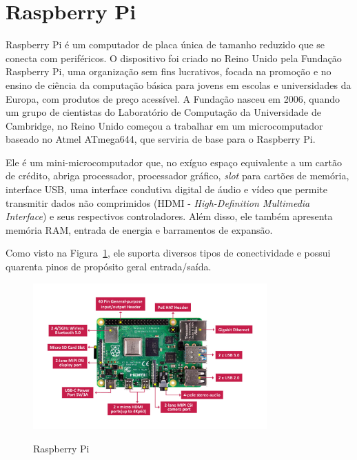 \section{Raspberry Pi}
\label{sec:raspberrypi}

Raspberry Pi é um computador de placa única de tamanho reduzido que se conecta com periféricos. O dispositivo foi criado no Reino Unido pela Fundação Raspberry Pi, uma organização sem fins lucrativos, focada na promoção e no ensino de ciência da computação básica para jovens em escolas e universidades da Europa, com produtos de preço acessível. A Fundação nasceu em 2006, quando um grupo de cientistas do Laboratório de Computação da Universidade de Cambridge, no Reino Unido começou a trabalhar em um microcomputador baseado no Atmel ATmega644, que serviria de base para o Raspberry Pi.

Ele é um mini-microcomputador que, no exíguo espaço equivalente a um cartão de crédito, abriga processador, processador gráfico, \textit{slot} para cartões de memória, interface USB, uma interface condutiva digital de áudio e vídeo que permite transmitir dados não comprimidos (HDMI - \textit{High-Definition Multimedia Interface}) e  seus respectivos controladores. Além disso, ele também apresenta memória RAM, entrada de energia e barramentos de expansão.

Como visto na Figura~\ref{fig:RaspberryPi-CAM}, ele suporta diversos tipos de conectividade e possui quarenta pinos de propósito geral entrada/saída.

\begin{figure}[!hbtp]
  \centering
   \caption{Raspberry Pi}
    \includegraphics[width = 0.8\textwidth]{Caps/Figs/mat-met/raspberryPI.jpg}
   \label{fig:RaspberryPi-CAM}
\end{figure}

